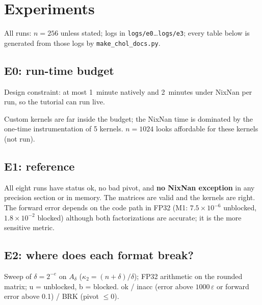 \documentclass[11pt,a4paper]{article}
\begin{document}
\section{Experiments}

All runs: $n=256$ unless stated; logs in \texttt{logs/e0}\ldots\texttt{logs/e3}; every table below is generated from those logs by \texttt{make\_chol\_docs.py}.

\subsection{E0: run-time budget}

Design constraint: at most 1~minute natively and 2~minutes under NixNan per run, so the tutorial can run live.

\begin{center}\small\end{center}

Custom kernels are far inside the budget; the NixNan time is dominated by the one-time instrumentation of 5 kernels. $n=1024$ looks affordable for these kernels (not run).

\subsection{E1: reference}

\begin{center}\small\end{center}

All eight runs have status ok, no bad pivot, and \textbf{no NixNan exception} in any precision section or in memory. The matrices are valid and the kernels are right.
The forward error depends on the code path in FP32 (M1: $7.5\times10^{-6}$ unblocked, $1.8\times10^{-2}$ blocked) although both factorizations are accurate; it is the more sensitive metric.

\subsection{E2: where does each format break?}\label{sec:e2}

Sweep of $\delta=2^{-e}$ on $A_\delta$ ($\kappa_2=(n+\delta)/\delta$); FP32 arithmetic on the rounded matrix; u = unblocked, b = blocked.
ok / inacc (error above $1000\,\varepsilon$ or forward error above 0.1) / BRK (pivot $\le0$).
\end{document}
